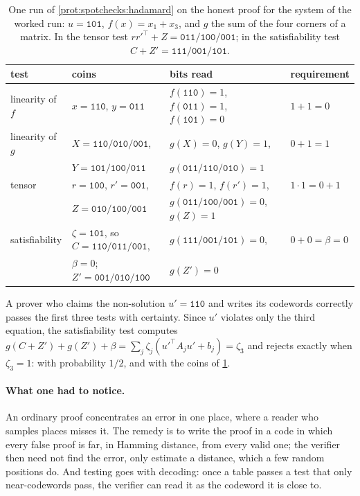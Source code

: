 \begin{refsection}
\begin{table}[t]
\begin{fullwidth}
\centering\small
\begin{tabular}{@{}llll@{}}
\toprule
test & coins & bits read & requirement\\
\midrule
linearity of $f$ & $x=\texttt{110}$, $y=\texttt{011}$ & $f(\texttt{110})=1$, $f(\texttt{011})=1$, $f(\texttt{101})=0$ & $1+1=0$\\
linearity of $g$ & $X=\texttt{110/010/001}$, & $g(X)=0$, $g(Y)=1$, & $0+1=1$\\
 & $Y=\texttt{101/100/011}$ & $g(\texttt{011/110/010})=1$ & \\
tensor & $r=\texttt{100}$, $r'=\texttt{001}$, & $f(r)=1$, $f(r')=1$, & $1\cdot1=0+1$\\
 & $Z=\texttt{010/100/001}$ & $g(\texttt{011/100/001})=0$, $g(Z)=1$ & \\
satisfiability & $\zeta=\texttt{101}$, so $C=\texttt{110/011/001}$, & $g(\texttt{111/001/101})=0$, & $0+0=\beta=0$\\
 & $\beta=0$; $Z'=\texttt{001/010/100}$ & $g(Z')=0$ & \\
\bottomrule
\end{tabular}
\end{fullwidth}
\caption{One run of \cref{prot:spotchecks:hadamard} on the honest proof for the system of the worked run: $u=\texttt{101}$, $f(x)=x_1+x_3$, and $g$ the sum of the four corners of a matrix. In the tensor test $rr'^\top+Z=\texttt{011/100/001}$; in the satisfiability test $C+Z'=\texttt{111/001/101}$.}
\label{tab:spotchecks:run}
\end{table}

A prover who claims the non-solution $u'=\texttt{110}$ and writes its codewords correctly passes the first three tests with certainty. Since $u'$ violates only the third equation, the satisfiability test computes $g(C+Z')+g(Z')+\beta=\sum_j\zeta_j(u'^\top A_ju'+b_j)=\zeta_3$ and rejects exactly when $\zeta_3=1$: with probability $1/2$, and with the coins of \cref{tab:spotchecks:run}.

\paragraph{What one had to notice.} An ordinary proof concentrates an error in one place, where a reader who samples places misses it. The remedy is to write the proof in a code in which every false proof is far, in Hamming distance, from every valid one; the verifier then need not find the error, only estimate a distance, which a few random positions do. And testing goes with decoding: once a table passes a test that only near-codewords pass, the verifier can read it as the codeword it is close to.


\end{refsection}
